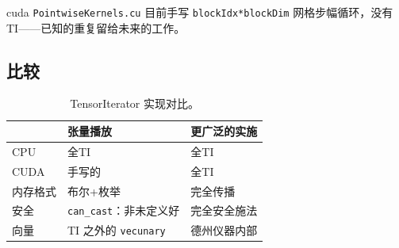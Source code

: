 \ac{cuda} \texttt{PointwiseKernels.cu} 目前手写 \texttt{blockIdx*blockDim} 网格步幅循环，没有 TI——已知的重复留给未来的工作。

\subsection{比较}

\begin{table}[H]
\centering
\caption{TensorIterator 实现对比。}
\label{tab:ti_compare}
\small
\begin{tabular}{lll}
\toprule
  & 张量播放 & 更广泛的实施 \\
\midrule
CPU & 全TI & 全TI \\
CUDA & 手写的 & 全TI \\
内存格式 & 布尔+枚举 & 完全传播 \\
安全 & \texttt{can\_cast}：非未定义好 & 完全安全施法 \\
向量 & TI 之外的 \texttt{vecunary} & 德州仪器内部 \\
\bottomrule
\end{tabular}
\end{table}

